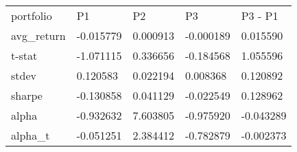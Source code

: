 \begin{tabular}{lllll}
\toprule
\midrule
portfolio & P1 & P2 & P3 & P3 - P1 \\
avg_return & -0.015779 & 0.000913 & -0.000189 & 0.015590 \\
t-stat & -1.071115 & 0.336656 & -0.184568 & 1.055596 \\
stdev & 0.120583 & 0.022194 & 0.008368 & 0.120892 \\
sharpe & -0.130858 & 0.041129 & -0.022549 & 0.128962 \\
alpha & -0.932632 & 7.603805 & -0.975920 & -0.043289 \\
alpha_t & -0.051251 & 2.384412 & -0.782879 & -0.002373 \\
\bottomrule
\end{tabular}
